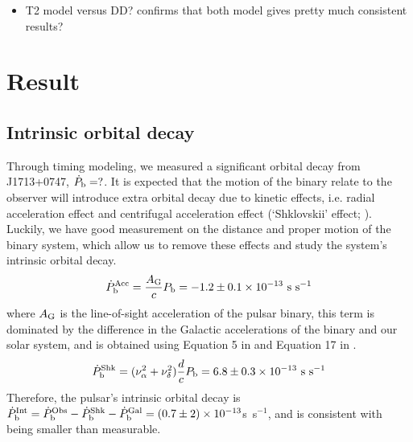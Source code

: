 \begin{itemize}
\item T2 model versus DD? confirms that both model gives pretty much consistent results?
\end{itemize}

\section{Result}

\subsection{Intrinsic orbital decay}
\label{sec:obdecay}
Through timing modeling, we measured a significant orbital decay from J1713+0747, $\dot{P}_{\rm b} = ?$. 
It is expected that the motion of the binary relate to the observer will introduce extra orbital decay due to kinetic effects, i.e. radial acceleration effect \citep{dt91} and centrifugal acceleration effect (`Shklovskii' effect; \citealt{shk70}). Luckily, we have good measurement on the distance and proper motion of the binary system, which allow us to remove these effects 
and study the system's intrinsic orbital decay.
\begin{equation}
\dot{P}_{\rm b}^{\rm Acc} = \frac{A_{\rm G}}{c} P_{\rm b} =
-1.2\pm0.1\times10^{-13}~{\rm s~s^{-1}}
\end{equation}
where $A_{\rm G}$ is the line-of-sight acceleration of the pulsar binary,
this term is dominated by the difference in the Galactic accelerations of the
binary and our solar system, and is obtained using
Equation 5 in \citet{nt95} and Equation 17 in \citet{lwj+09}.
\begin{equation}
\dot{P}_{\rm b}^{\rm Shk} = (\nu_{\alpha}^2+\nu_{\delta}^2)\frac{d}{c}P_{\rm
b} = 6.8\pm0.3\times10^{-13}~{\rm s~s^{-1}}
\end{equation}
Therefore, the pulsar's intrinsic orbital decay is $\dot{P}_{\rm b}^{\rm Int}
= \dot{P}_{\rm b}^{\rm Obs} - \dot{P}_{\rm b}^{\rm Shk} - \dot{P}_{\rm b}^{\rm
Gal} = (0.7\pm2)\times10^{-13}$s~s$^{-1}$, and is consistent with being smaller than measurable.

